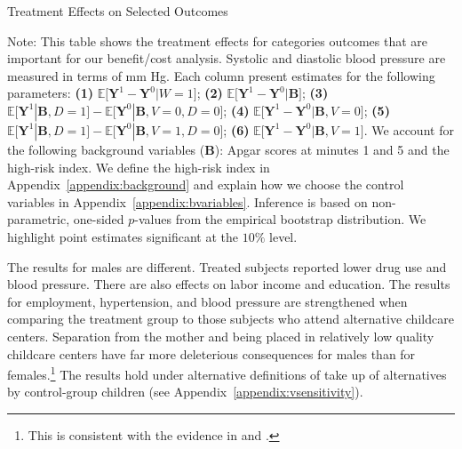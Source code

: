 \begin{table}[!htbp]
\centering
\begin{threeparttable}
\caption{Treatment Effects on Selected Outcomes}\label{table:tescombined}
\begin{scriptsize}

\end{scriptsize}
\begin{tablenotes}
\tiny
Note: This table shows the treatment effects for categories outcomes that are important for our benefit/cost analysis. Systolic and diastolic blood pressure are measured in terms of mm Hg. Each column present estimates for the following parameters: \textbf{(1)} $\mathbb{E} \big[ \bm{Y}^1 - \bm{Y}^0 | W = 1]$; {\textbf{(2)} $\mathbb{E} \big[ \bm{Y}^1 - \bm{Y}^0 | \bm{B} \big]$}; {\textbf{(3)} $\mathbb{E} \big[ \bm{Y}^1 | \bm{B}, D=1 \big] - \mathbb{E} \big[ \bm{Y}^0 | \bm{B}, V=0, D=0 \big]$}; {\textbf{(4)} $\mathbb{E} \big[ \bm{Y}^1 - \bm{Y}^0 | \bm{B}, V=0 \big] $}; {\textbf{(5)} $\mathbb{E} \big[ \bm{Y}^1 | \bm{B}, D=1 \big] - \mathbb{E} \big[ \bm{Y}^0 | \bm{B}, V=1, D = 0 \big]$}; {\textbf{(6)} $\mathbb{E} \big[ \bm{Y}^1 - \bm{Y}^0 | \bm{B}, V=1 \big]$}. We account for the following background variables ($\bm{B}$): Apgar scores at minutes 1 and 5 and the high-risk index. We define the high-risk index in Appendix~\ref{appendix:background} and explain how we choose the control variables in Appendix~\ref{appendix:bvariables}. Inference is based on non-parametric, one-sided $p$-values from the empirical bootstrap distribution. We highlight point estimates significant at the $10\%$ level.
\end{tablenotes}
\end{threeparttable}
\end{table}
\restoregeometry
\doublespacing

The results for males are different. Treated subjects reported lower drug use and blood pressure. There are also effects on labor income and education. The results for employment, hypertension, and blood pressure are strengthened when comparing the treatment group to those subjects who attend alternative childcare centers. Separation from the mother and being placed in relatively low quality childcare centers have far more deleterious consequences for males than for females.\footnote{This is consistent with the evidence in \citet{Baker_Gruber_Milligan_2015_Noncog_Defects} and \citet{Kottelenberg-Lehrer_2014_Gender-Effects}.} The results hold under alternative definitions of take up of alternatives by control-group children (see Appendix~\ref{appendix:vsensitivity}).

